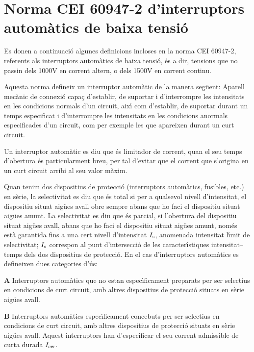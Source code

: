 \section{Norma CEI 60947-2  d'interruptors autom\`{a}tics  de baixa tensi\'{o}}


Es donen a continuaci\'{o} algunes definicions incloses en la norma \textsf{CEI 60947-2}, referents als interruptors autom\`{a}tics de baixa tensi\'{o}, \'{e}s a dir, tensions que no passin dels 1000\unit{V} en corrent altern, o dels 1500\unit{V} en corrent continu.

Aquesta norma defineix un interruptor autom\`{a}tic de la manera seg\"{u}ent: Aparell mec\`{a}nic de connexi\'{o} capa\c{c} d'establir, de suportar i d'interrompre les intensitats en les condicions normals d'un circuit, aix\'{\i} com d'establir, de suportar durant un temps especificat i  d'interrompre les intensitats en les condicions anormals especificades d'un circuit, com per exemple les que apareixen durant un curt circuit.

Un interruptor autom\`{a}tic es diu que \'{e}s limitador de corrent, quan el seu temps d'obertura \'{e}s particularment breu, per tal d'evitar que el corrent que s'origina en un curt circuit arribi al seu valor m\`{a}xim.

Quan tenim dos  dispositius de protecci\'{o} (interruptors autom\`{a}tics, fusibles, etc.) en s\`{e}rie, la selectivitat es diu que \'{e}s total si per a qualsevol nivell d'intensitat, el dispositiu situat aig\"{u}es avall obre sempre abans que ho faci el dispositiu situat aig\"{u}es amunt. La selectivitat es diu que \'{e}s parcial, si l'obertura del dispositiu situat aig\"{u}es avall, abans que ho faci el dispositiu situat aig\"{u}es amunt, nom\'{e}s est\`{a} garantida fins a una cert nivell d'intensitat $I_\mathrm{s}$, anomenada intensitat l\'{\i}mit de selectivitat; $I_\mathrm{s}$ correspon al punt d'intersecci\'{o} de les caracter\'{\i}stiques intensitat--temps dels dos dispositius de protecci\'{o}. En el cas d'interruptors autom\`{a}tics es defineixen dues categories d'\'{u}s:
 \begin{list}{}
   {\setlength{\labelwidth}{10mm} \setlength{\leftmargin}{10mm} \setlength{\labelsep}{2mm}}
   \item[\textbf{A}] Interruptors autom\`{a}tics que no estan espec\'{\i}ficament preparats per ser selectius en condicions de curt circuit, amb altres dispositius de protecci\'{o} situats en s\`{e}rie  aig\"{u}es avall.
   \item[\textbf{B}] Interruptors autom\`{a}tics espec\'{\i}ficament concebuts per ser selectius en condicions de curt circuit, amb altres dispositius de protecci\'{o} situats en s\`{e}rie  aig\"{u}es avall. Aquest interruptors han d'especificar el seu corrent admissible de curta durada $I_\mathrm{cw}$.
\end{list}

